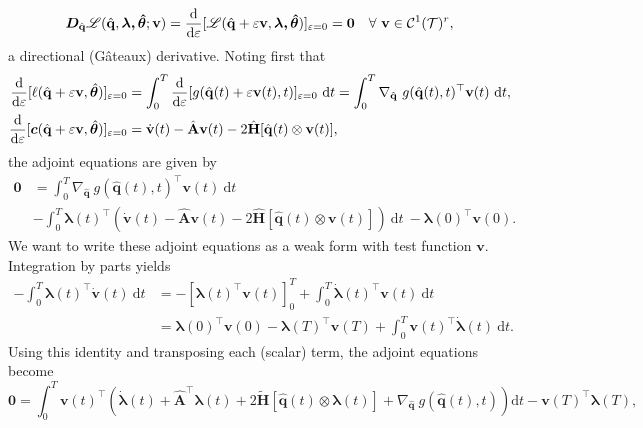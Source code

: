 $$ \bm{D}_{\hat{\mathbf{q}}} \mathscr{L}(\hat{\mathbf{q}},\bm{\lambda,\hat{\bm{\theta}}};\mathbf{v}) = \dv{}{\varepsilon}[\mathscr{L}(\hat{\mathbf{q}}+\varepsilon \mathbf{v},\bm{\lambda,\hat{\bm{\theta}}})]_{\varepsilon=0} = \bm{0}~~~\forall~\mathbf{v}\in\mathcal{C}^1(\mathcal{T})^r,$$a directional (Gâteaux) derivative. Noting first that\\
\begin{align*}
    \dv{}{\varepsilon}[\mathcal{\ell}(\hat{\mathbf{q}}+\varepsilon \mathbf{v},\hat{\bm{\theta}})]_{\varepsilon=0} &= \int_0^T \dv{}{\varepsilon}[g(\hat{\mathbf{q}}(t)+\varepsilon \mathbf{v}(t),t)]_{\varepsilon=0}~\mathrm{d}t = \int_0^T \nabla_{\hat{\mathbf{q}}}~g(\hat{\mathbf{q}}(t),t)^{\top}\mathbf{v}(t)~\mathrm{d}t,\\
    \dv{}{\varepsilon}[\boldsymbol{c}(\hat{\mathbf{q}}+\varepsilon \mathbf{v},\hat{\bm{\theta}})]_{\varepsilon=0} &= \dot{\mathbf{v}}(t) - \hat{\mathbf{A}}\mathbf{v}(t) - 2\hat{\mathbf{H}}[\hat{\mathbf{q}}(t)\otimes \mathbf{v}(t)],
\end{align*}
the adjoint equations are given by\\
\begin{align*}
    \bm{0} &= \int_0^T \nabla_{\hat{\mathbf{q}}}~g(\hat{\mathbf{q}}(t),t)^{\top}\mathbf{v}(t)~\mathrm{d}t\\
    &- \int_0^T \bm{\lambda}(t)^{\top} \left( \dot{\mathbf{v}}(t) - \hat{\mathbf{A}}\mathbf{v}(t) - 2\hat{\mathbf{H}}[\hat{\mathbf{q}}(t)\otimes \mathbf{v}(t)] \right)~\mathrm{d}t~- \bm{\lambda}(0)^{\top}\mathbf{v}(0). 
\end{align*}
We want to write these adjoint equations as a weak form with test function $\mathbf{v}$. Integration by parts yields\\
\begin{align*}
    -\int_0^T\bm{\lambda}(t)^{\top} \dot{\mathbf{v}}(t)~\mathrm{d}t &= -\left[ \bm{\lambda}(t)^{\top} \mathbf{v}(t) \right]_0^T + \int_0^T \dot{\bm{\lambda}}(t)^{\top}\mathbf{v}(t)~\mathrm{d}t\\
    &= \bm{\lambda}(0)^{\top} \mathbf{v}(0) - \bm{\lambda}(T)^{\top} \mathbf{v}(T) + \int_0^T \mathbf{v}(t)^{\top}\dot{\bm{\lambda}}(t)~\mathrm{d}t.
\end{align*}
Using this identity and transposing each (scalar) term, the adjoint equations become\\
\begin{equation*}
    \bm{0} = \int_0^T \mathbf{v}(t)^{\top} \left( \dot{\bm{\lambda}}(t) + \hat{\mathbf{A}}^{\top} \bm{\lambda}(t) + 2\tilde{\mathbf{H}}[\hat{\mathbf{q}}(t)\otimes \bm{\lambda}(t)] + \nabla_{\hat{\mathbf{q}}}~g(\hat{\mathbf{q}}(t),t) \right)\mathrm{d}t - \mathbf{v}(T)^{\top}\bm{\lambda}(T), 
\end{equation*}
